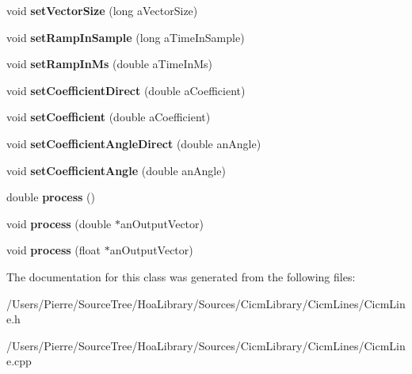 \begin{DoxyCompactItemize}
\item 
\hypertarget{class_cicm_line_a9419a101fdf049f9e855d8bbdae8f29e}{void {\bfseries set\-Vector\-Size} (long a\-Vector\-Size)}\label{class_cicm_line_a9419a101fdf049f9e855d8bbdae8f29e}

\item 
\hypertarget{class_cicm_line_a89d140e24cd85fdb204a6cbec78d4ccb}{void {\bfseries set\-Ramp\-In\-Sample} (long a\-Time\-In\-Sample)}\label{class_cicm_line_a89d140e24cd85fdb204a6cbec78d4ccb}

\item 
\hypertarget{class_cicm_line_a54f0738d51e79440f8774ebd3db6a531}{void {\bfseries set\-Ramp\-In\-Ms} (double a\-Time\-In\-Ms)}\label{class_cicm_line_a54f0738d51e79440f8774ebd3db6a531}

\item 
\hypertarget{class_cicm_line_aabed1bbf0cef11ed2b0c2bc8450c8b65}{void {\bfseries set\-Coefficient\-Direct} (double a\-Coefficient)}\label{class_cicm_line_aabed1bbf0cef11ed2b0c2bc8450c8b65}

\item 
\hypertarget{class_cicm_line_a962efdd6afc99305b8663a01bc4b949c}{void {\bfseries set\-Coefficient} (double a\-Coefficient)}\label{class_cicm_line_a962efdd6afc99305b8663a01bc4b949c}

\item 
\hypertarget{class_cicm_line_a1e1752f201920a7af75e6e7d6e9d08f0}{void {\bfseries set\-Coefficient\-Angle\-Direct} (double an\-Angle)}\label{class_cicm_line_a1e1752f201920a7af75e6e7d6e9d08f0}

\item 
\hypertarget{class_cicm_line_a27ed029ebf97d8aaf71cfce8f434e665}{void {\bfseries set\-Coefficient\-Angle} (double an\-Angle)}\label{class_cicm_line_a27ed029ebf97d8aaf71cfce8f434e665}

\item 
\hypertarget{class_cicm_line_a58922c3dbc60ff5a17bfcb06100976c8}{double {\bfseries process} ()}\label{class_cicm_line_a58922c3dbc60ff5a17bfcb06100976c8}

\item 
\hypertarget{class_cicm_line_ac9079de8b316a3d4dd69eb7a59e9ac2d}{void {\bfseries process} (double $\ast$an\-Output\-Vector)}\label{class_cicm_line_ac9079de8b316a3d4dd69eb7a59e9ac2d}

\item 
\hypertarget{class_cicm_line_aca247cb4434cd2b171d5865a12e83be4}{void {\bfseries process} (float $\ast$an\-Output\-Vector)}\label{class_cicm_line_aca247cb4434cd2b171d5865a12e83be4}

\end{DoxyCompactItemize}


The documentation for this class was generated from the following files\-:\begin{DoxyCompactItemize}
\item 
/\-Users/\-Pierre/\-Source\-Tree/\-Hoa\-Library/\-Sources/\-Cicm\-Library/\-Cicm\-Lines/Cicm\-Line.\-h\item 
/\-Users/\-Pierre/\-Source\-Tree/\-Hoa\-Library/\-Sources/\-Cicm\-Library/\-Cicm\-Lines/Cicm\-Line.\-cpp\end{DoxyCompactItemize}
